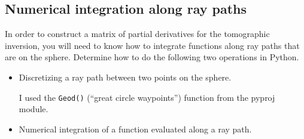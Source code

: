 \documentclass[11pt,titlepage,fleqn]{article}
\begin{document}
\subsection*{Numerical integration along ray paths}

In order to construct a matrix of partial derivatives for the tomographic inversion, you will need to know how to integrate functions along ray paths that are on the sphere. Determine how to do the following two operations in Python.

\begin{itemize}
\item Discretizing a ray path between two points on the sphere.

I used the \verb+Geod()+ (``great circle waypoints'') function from the pyproj module.

\item Numerical integration of a function evaluated along a ray path.

\end{itemize}




\end{document}
